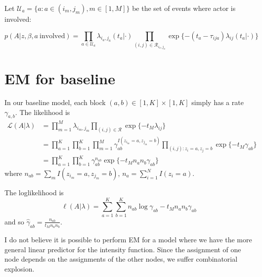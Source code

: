 \documentclass[11pt]{article}
\begin{document}
Let $\mathcal{U}_a = \{a: a \in (i_m,j_m), m \in [1,M]\}$ be the set of events where actor is involved:

$$p(A|z,\beta,a \ \mbox{involved}) = \prod_{a \in \mathcal{U}_a} \lambda_{i_a,j_a}(t_a|\cdot)
\prod_{(i,j) \in \mathcal{R}_{i_a,j_a}} \exp \{ -(t_a - \tau_{ija}) \lambda_{ij}(t_a|\cdot)\}$$

\section{EM for baseline}

In our baseline model, each block $(a,b) \in [1,K] \times [1,K]$ simply has a rate $\gamma_{a,b}$.
The likelihood is
\begin{align*}
\mathcal{L}(A|\lambda) &= \prod_{m=1}^M \lambda_{i_m,j_m} \prod_{(i,j) \in \mathcal{R}} \exp\{-t_M\lambda_{ij}\} \\
& =\prod_{a=1}^K \prod_{b=1}^K \prod_{m=1}^M \gamma_{ab}^{I(z_{i_m}=a,z_{j_m}=b)} \prod_{(i,j): z_i=a,z_j=b} \exp\{-t_M\gamma_{ab}\} \\
& =\prod_{a=1}^K\prod_{b=1}^K \gamma_{ab}^{n_{ab}} \exp\{-t_Mn_an_b\gamma_{ab}\}
\end{align*}
where $n_{ab} = \sum_m I(z_{i_m}=a,z_{j_m}=b)$, $n_a = \sum_{i=1}^N I(z_i=a)$.

The loglikelihood is $$\ell(A|\lambda) = \sum_{a=1}^K \sum_{b=1}^K n_{ab} \log \gamma_{ab} - t_M n_a n_b \gamma_{ab}$$
and so $\hat{\gamma}_{ab} = \frac{n_{ab}}{t_Mn_an_b}$.


I do not believe it is possible to perform EM for a model where we have the more general linear predictor for the intensity function.  Since the assignment of one node depends on the assignments of the other nodes, we suffer combinatorial explosion.


\end{document}
